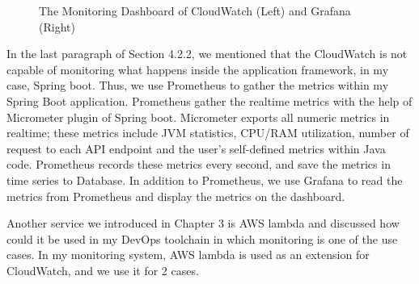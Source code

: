 \begin{figure}[!tbp]
\begin{minipage}[b]{0.50\textwidth}
     \end{minipage}
     \caption{The Monitoring Dashboard of CloudWatch (Left) and Grafana (Right)}
     \label{fig:monitoring}
   \end{figure}
\par
In the last paragraph of Section 4.2.2, we mentioned that the CloudWatch is not capable of monitoring what happens inside the application framework, in my case, Spring boot. Thus, we use Prometheus to gather the metrics within my Spring Boot application. Prometheus gather the realtime metrics with the help of Micrometer plugin of Spring boot. Micrometer exports all numeric metrics in realtime; these metrics include JVM statistics, CPU/RAM utilization, number of request to each API endpoint and the user's self-defined metrics within Java code. Prometheus records these metrics every second, and save the metrics in time series to Database. In addition to Prometheus, we use Grafana to read the metrics from Prometheus and display the metrics on the dashboard.
\par
Another service we introduced in Chapter 3 is AWS lambda and discussed how could it be used in my DevOps toolchain in which monitoring is one of the use cases. In my monitoring system, AWS lambda is used as an extension for CloudWatch, and we use it for 2 cases.
